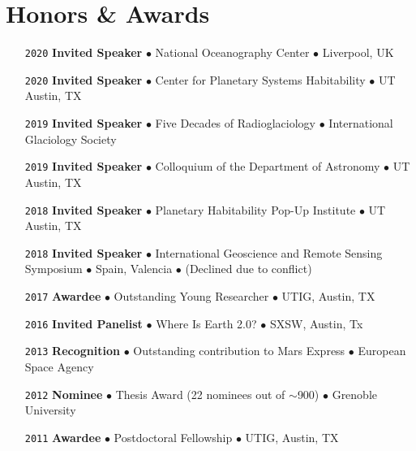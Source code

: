 \section*{Honors \& Awards}
\vspace{-.5em}

\begin{itemize}[leftmargin=3.8em, labelsep=1.5em]
    \setlength\itemsep{-.5em}
    \item[\texttt{2020}] \textbf{Invited Speaker} $\bullet$ National Oceanography Center $\bullet$ Liverpool, UK
    \item[\texttt{2020}] \textbf{Invited Speaker} $\bullet$ Center for Planetary Systems Habitability $\bullet$ UT Austin, TX
    \item[\texttt{2019}] \textbf{Invited Speaker} $\bullet$ Five Decades of Radioglaciology $\bullet$ International Glaciology Society
    \item[\texttt{2019}] \textbf{Invited Speaker} $\bullet$ Colloquium of the Department of Astronomy $\bullet$ UT Austin, TX
    \item[\texttt{2018}] \textbf{Invited Speaker} $\bullet$ Planetary Habitability Pop-Up Institute $\bullet$ UT Austin, TX
    \item[\texttt{2018}] \textbf{Invited Speaker} $\bullet$ International Geoscience and Remote Sensing Symposium $\bullet$ Spain, Valencia $\bullet$ (Declined due to conflict)
    \item[\texttt{2017}] \textbf{Awardee} $\bullet$ Outstanding Young Researcher $\bullet$ UTIG, Austin, TX
    \item[\texttt{2016}] \textbf{Invited Panelist} $\bullet$ Where Is Earth 2.0? $\bullet$ SXSW, Austin, Tx
    \item[\texttt{2013}] \textbf{Recognition} $\bullet$ Outstanding contribution to Mars Express $\bullet$ European Space Agency
    \item[\texttt{2012}] \textbf{Nominee} $\bullet$ Thesis Award (22 nominees out of $\sim$900) $\bullet$ Grenoble University
    \item[\texttt{2011}] \textbf{Awardee} $\bullet$ Postdoctoral Fellowship $\bullet$ UTIG, Austin, TX
\end{itemize}
